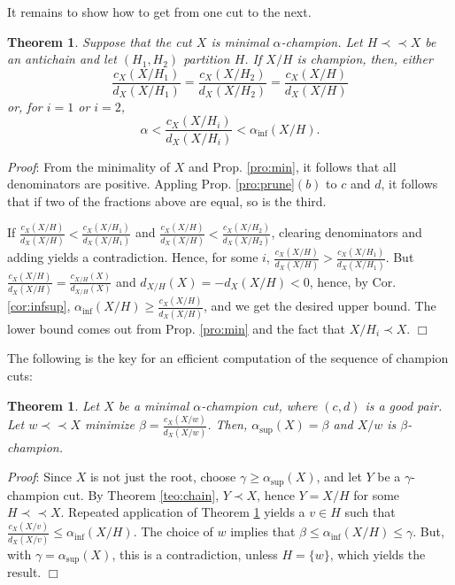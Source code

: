 \documentclass[12pt]{article}
\newenvironment{proof}{
  {\noindent\em Proof\/}:}{\hfill$\Box$\vspace{3 mm}}
\newtheorem{teo}[lem]{Theorem}
\newcommand{\al}{\ensuremath{\alpha}\xspace}
\newcommand{\alinf}{\ensuremath{\alpha_{\inf{}}}\xspace}
\newcommand{\alsup}{\ensuremath{\alpha_{\sup{}}}\xspace}
\newcommand{\cd}{\ensuremath{(c,d)}\xspace}
\newcommand{\bip}{\prec\!\!\prec}
\begin{document}
It remains to show how to get from one cut to the next.

\begin{teo}\label{teo:prune}
  Suppose that the cut \(X\) is minimal \al-champion.  Let \(H\bip X\) be an
  antichain and let \((H_1, H_2)\) partition \(H\).  If \(X/H\) is champion,
  then, either
  \[
    \frac{c_X(X/H_1)}{d_X(X/H_1)} = \frac{c_X(X/H_2)}{d_X(X/H_2)} = \frac{c_X(X/H)}{d_X(X/H)}
  \]
  or, for \(i=1\) or \(i=2\),
  \[
    \al < \frac{c_X(X/H_i)}{d_X(X/H_i)} < \alinf(X/H). 
  \]
\end{teo}
\begin{proof}
  From the minimality of \(X\) and Prop. \ref{pro:min}, it follows that all
  denominators are positive.  Appling Prop. \ref{pro:prune}\((b)\) to \(c\)
  and \(d\), it follows that if two of the fractions above are equal, so is
  the third.

  If \(\frac{c_X(X/H)}{d_X(X/H)}<\frac{c_X(X/H_1)}{d_X(X/H_1)}\) and
  \(\frac{c_X(X/H)}{d_X(X/H)}<\frac{c_X(X/H_2)}{d_X(X/H_2)}\), clearing
  denominators and adding yields a contradiction.  Hence, for some \(i\),
  \(\frac{c_X(X/H)}{d_X(X/H)}>\frac{c_X(X/H_1)}{d_X(X/H_1)}\).  But
  \(\frac{c_X(X/H)}{d_X(X/H)}= \frac{c_{X/H}(X)}{d_{X/H}(X)}\) and
  \(d_{X/H}(X)=-d_X(X/H)<0\), hence, by Cor. \ref{cor:infsup},
  \(\alinf(X/H)\geq \frac{c_X(X/H)}{d_X(X/H)}\), and we get the desired upper
  bound.  The lower bound comes out from Prop. \ref{pro:min} and the fact that
  \(X/H_i \prec X\).
\end{proof}

The following is the key for an efficient computation of the sequence of
champion cuts:
\begin{teo}\label{teo:next}
  Let \(X\) be a minimal \al-champion cut, where \cd is a good pair.  Let
  \(w\bip X\) minimize \(\beta=\frac{c_X(X/w)}{d_X(X/w)}\).  Then,
    \(\alsup(X)=\beta\) and \(X/w\) is \(\beta\)-champion.
\end{teo}
\begin{proof}
  Since \(X\) is not just the root, choose \(\gamma \geq \alsup(X)\), and let
  \(Y\) be a \(\gamma\)-champion cut.  By Theorem \ref{teo:chain},
  \(Y\prec X\), hence \(Y=X/H\) for some \(H\bip X\).  Repeated application of
  Theorem \ref{teo:prune} yields a \(v\in H\) such that
  \(\frac{c_X(X/v)}{d_X(X/v)}\leq \alinf(X/H)\).  The choice of \(w\) implies
  that \(\beta\leq\alinf(X/H)\leq\gamma\).  But, with \(\gamma=\alsup(X)\),
  this is a contradiction, unless \(H=\{w\}\), which yields the result.
\end{proof}
\end{document}
